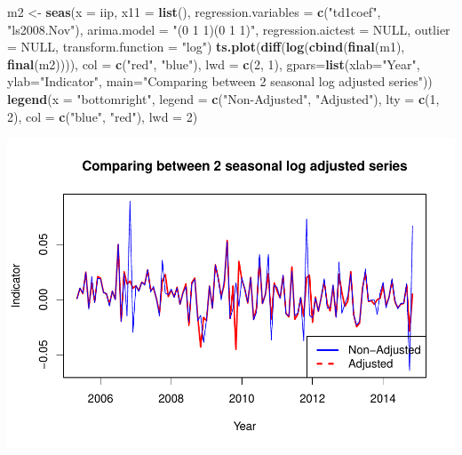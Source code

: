 \documentclass[
]{article}
\newenvironment{Shaded}{\begin{snugshade}}{\end{snugshade}}
\newcommand{\AttributeTok}[1]{\textcolor[rgb]{0.13,0.29,0.53}{#1}}
\newcommand{\ConstantTok}[1]{\textcolor[rgb]{0.56,0.35,0.01}{#1}}
\newcommand{\DecValTok}[1]{\textcolor[rgb]{0.00,0.00,0.81}{#1}}
\newcommand{\FunctionTok}[1]{\textcolor[rgb]{0.13,0.29,0.53}{\textbf{#1}}}
\newcommand{\NormalTok}[1]{#1}
\newcommand{\OtherTok}[1]{\textcolor[rgb]{0.56,0.35,0.01}{#1}}
\newcommand{\StringTok}[1]{\textcolor[rgb]{0.31,0.60,0.02}{#1}}
\begin{document}
\begin{Shaded}
\begin{Highlighting}[]
\NormalTok{m2 }\OtherTok{\textless{}{-}} \FunctionTok{seas}\NormalTok{(}\AttributeTok{x =}\NormalTok{ iip, }\AttributeTok{x11 =} \FunctionTok{list}\NormalTok{(), }\AttributeTok{regression.variables =} \FunctionTok{c}\NormalTok{(}\StringTok{"td1coef"}\NormalTok{, }\StringTok{"ls2008.Nov"}\NormalTok{), }
           \AttributeTok{arima.model =} \StringTok{"(0 1 1)(0 1 1)"}\NormalTok{, }\AttributeTok{regression.aictest =} \ConstantTok{NULL}\NormalTok{, }\AttributeTok{outlier =} \ConstantTok{NULL}\NormalTok{, }
           \AttributeTok{transform.function =} \StringTok{"log"}\NormalTok{)}
\FunctionTok{ts.plot}\NormalTok{(}\FunctionTok{diff}\NormalTok{(}\FunctionTok{log}\NormalTok{(}\FunctionTok{cbind}\NormalTok{(}\FunctionTok{final}\NormalTok{(m1), }\FunctionTok{final}\NormalTok{(m2)))), }\AttributeTok{col =} \FunctionTok{c}\NormalTok{(}\StringTok{"red"}\NormalTok{, }\StringTok{"blue"}\NormalTok{), }\AttributeTok{lwd =} \FunctionTok{c}\NormalTok{(}\DecValTok{2}\NormalTok{, }\DecValTok{1}\NormalTok{),  }\AttributeTok{gpars=}\FunctionTok{list}\NormalTok{(}\AttributeTok{xlab=}\StringTok{"Year"}\NormalTok{, }\AttributeTok{ylab=}\StringTok{"Indicator"}\NormalTok{, }\AttributeTok{main=}\StringTok{"Comparing between 2 seasonal log adjusted series"}\NormalTok{))}
\FunctionTok{legend}\NormalTok{(}\AttributeTok{x =} \StringTok{"bottomright"}\NormalTok{,          }
       \AttributeTok{legend =} \FunctionTok{c}\NormalTok{(}\StringTok{"Non{-}Adjusted"}\NormalTok{, }\StringTok{"Adjusted"}\NormalTok{),}
       \AttributeTok{lty =} \FunctionTok{c}\NormalTok{(}\DecValTok{1}\NormalTok{, }\DecValTok{2}\NormalTok{),           }
       \AttributeTok{col =} \FunctionTok{c}\NormalTok{(}\StringTok{"blue"}\NormalTok{, }\StringTok{"red"}\NormalTok{),}
       \AttributeTok{lwd =} \DecValTok{2}\NormalTok{) }
\end{Highlighting}
\end{Shaded}

\includegraphics{regressors_of_diwali_seasonality_for_industrial_production_files/figure-latex/unnamed-chunk-11-1.pdf}
\end{document}
